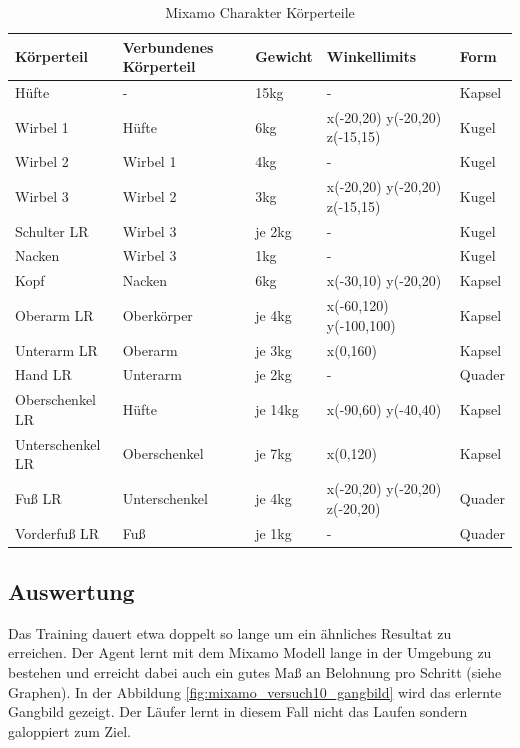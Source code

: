 \begin{table}[H]
  \centering
  {
  \begin{tabular}{ |p{3cm}|p{3cm}|p{2cm}|p{4cm}|p{2cm}| }
  \hline
  \textbf{Körpertei}l& \textbf{Verbundenes Körperteil} & \textbf{Gewicht} & \textbf{Winkellimits} & \textbf{Form} \\
  \hline
  Hüfte & - & 15kg & - & Kapsel \\
  \hline
  Wirbel 1 & Hüfte & 6kg & x(-20,20) y(-20,20) z(-15,15) & Kugel \\
  \hline
  Wirbel 2 & Wirbel 1 & 4kg & - & Kugel \\
  \hline
  Wirbel 3 & Wirbel 2 & 3kg & x(-20,20) y(-20,20) z(-15,15) & Kugel \\
  \hline
  Schulter LR & Wirbel 3 & je 2kg& - & Kugel \\
  \hline
  Nacken & Wirbel 3 & 1kg & - & Kugel \\
  \hline
  Kopf & Nacken & 6kg & x(-30,10) y(-20,20) & Kapsel \\
  \hline
  Oberarm LR & Oberkörper & je 4kg & x(-60,120) y(-100,100) & Kapsel \\
  \hline
  Unterarm LR & Oberarm & je 3kg & x(0,160) & Kapsel \\
  \hline
  Hand LR & Unterarm & je 2kg & - & Quader \\
  \hline
  Oberschenkel LR & Hüfte & je 14kg& x(-90,60) y(-40,40) & Kapsel \\
  \hline
  Unterschenkel LR & Oberschenkel & je 7kg &  x(0,120) & Kapsel \\
  \hline
  Fuß LR & Unterschenkel & je 4kg & x(-20,20) y(-20,20) z(-20,20) & Quader \\
  \hline
  Vorderfuß LR & Fuß & je 1kg & - & Quader \\
  \hline
  \end{tabular}}
  \caption{Mixamo Charakter Körperteile}
  \label{table:mixamo_körperteile}
\end{table}

\subsection{Auswertung}
Das Training dauert etwa doppelt so lange um ein ähnliches Resultat zu erreichen. Der Agent lernt mit dem Mixamo Modell lange in der Umgebung zu bestehen und erreicht dabei auch ein gutes Maß an Belohnung pro Schritt (siehe Graphen). In der Abbildung \ref{fig:mixamo_versuch10_gangbild} wird das erlernte Gangbild gezeigt. Der Läufer lernt in diesem Fall nicht das Laufen sondern galoppiert zum Ziel.

